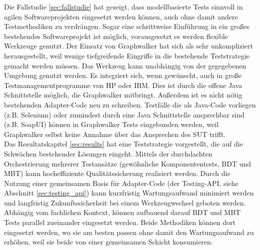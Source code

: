 Die Fallstudie \ref{sec:fallstudie}  hat gezeigt, dass modellbasierte Tests sinnvoll in agilen Softwareprojekten eingesetzt werden können, auch ohne damit andere Testmethodiken zu verdrängen. Sogar eine schrittweise Einführung in ein großes bestehendes Softwareprojekt ist möglich, vorausgesetzt es werden flexible Werkzeuge genutzt. Der Einsatz von Graphwalker hat sich als sehr unkompliziert herausgestellt, weil wenige tiefgreifende Eingriffe in die bestehende Teststrategie gemacht werden müssen. Das Werkzeug kann unabhängig von der gegegebenen Umgebung genutzt werden. Es integriert sich, wenn gewünscht, auch in große Testmanagementprogramme von HP oder IBM. Dies ist durch die offene Java Schnittstelle möglich, die Graphwalker mitbringt. Außerdem ist es nicht nötig bestehenden Adapter-Code neu zu schreiben. Testfälle die als Java-Code vorliegen (z.B. Selenium) oder zumindest durch eine Java Schnittstelle ansprechbar sind (z.B. SoapUI) können in Graphwalker Tests eingebunden werden, weil Graphwalker selbst keine Annahme über das Ansprechen des \Gls{SUT} trifft.\\
Das Resultatskapitel \ref{sec:results} hat eine Teststrategie vorgestellt, die auf die Schwächen bestehender Lösungen eingeht. Mittels der durchdachten Orchestrierung mehrerer Testansätze (gewöhnliche Komponententests, \Gls{BDT} und \Gls{MBT}) kann hocheffiziente Qualitätssicherung realisiert werden. Durch die Nutzung einer gemeinsamen Basis für Adapter-Code (der Testing-API, siehe Abschnitt \ref{sec:testing_api}) kann kurzfristig Wartungsaufwand minimiert werden und langfristig Zukunftssicherheit bei einem Werkzeugwechsel geboten werden. 
Abhängig vom fachlichen Kontext, können aufbauend darauf \Gls{BDT} und \Gls{MBT} Tests parallel zueinander eingesetzt werden. Beide Methodiken können dort eingesetzt werden, wo sie am besten passen ohne damit den Wartungsaufwand zu erhöhen, weil sie beide von einer gemeinsamen Schicht konsumieren.\\
